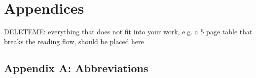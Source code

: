 \chapter*{Appendices}
\label{appendices}
DELETEME: everything that does not fit into your work, e.g. a 5 page table that breaks the reading flow, should be placed here

{}
\section*{Appendix A: Abbreviations}
